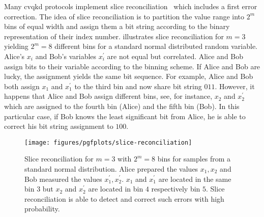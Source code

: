 Many \gls{cvqkd} protocols implement slice reconciliation~\cite{Grosshans2002} which includes a first error correction.
The idea of slice reconciliation is to partition the value range into $2^m$ bins of equal width and assign them a bit string according to the binary representation of their index number.
 illustrates slice reconciliation for $m=3$ yielding $2^m=8$ different bins for a standard normal distributed random variable.
Alice's $x_i$ and Bob's variables $x_i^\prime$ are not equal but correlated.
Alice and Bob assign bits to their variable according to the binning scheme.
If Alice and Bob are lucky, the assignment yields the same bit sequence.
For example, Alice and Bob both assign $x_1$ and $x_1^\prime$ to the third bin and now share bit string $011$.
However, it happens that Alice and Bob assign different bins, see, for instance, $x_2$ and $x_2^\prime$ which are assigned to the fourth bin (Alice) and the fifth bin (Bob).
In this particular case, if Bob knows the least significant bit from Alice, he is able to correct his bit string assignment to $100$.
\begin{figure}[htb]
	\centering
	\texttt{[image: figures/pgfplots/slice-reconciliation]}
	\caption{Slice reconciliation for $m=3$ with $2^m=8$ bins for samples from a standard normal distribution. Alice prepared the values $x_1,x_2$ and Bob measured the values $x_1^\prime,x_2^\prime$. $x_1$ and $x_1^\prime$ are located in the same bin $3$ but $x_2$ and $x_2^\prime$ are located in bin $4$ respectively bin $5$. Slice reconciliation is able to detect and correct such errors with high probability.}\label{fig:slice_reconciliation}
\end{figure}

